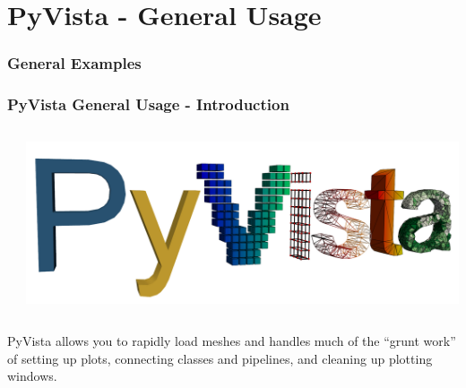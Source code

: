 \documentclass[t]{beamer}
\renewcommand{\footnotesize}{\scriptsize}
\begin{document}
\section{PyVista - General Usage}

\begin{frame}
    \frametitle{General Examples}
    \tableofcontents[currentsection]
\end{frame}

\begin{frame}
    \frametitle{PyVista General Usage - Introduction}

    \vspace{20pt}

    \begin{columns}[T]

        \begin{column}{.5\textwidth}
            \vspace{-10pt}
            \inputminted[fontsize=\footnotesize]{python}{code/pv_example1.py}
        \end{column}

        \begin{column}{.4\textwidth}
            \vspace{-10pt}
            \centering
            \includegraphics[height=0.2\textheight]{figures/pyvista_logo.png}
        \end{column}

    \end{columns}
    \vspace{5pt}

    PyVista allows you to rapidly load meshes and handles much of the “grunt
    work” of setting up plots, connecting classes and pipelines, and cleaning up
    plotting windows.

    \vspace{5pt}


\end{frame}
\end{document}
